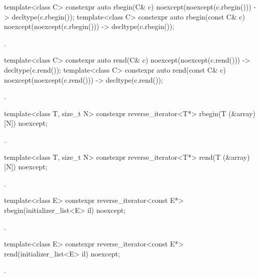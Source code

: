 %
\begin{itemdecl}
template<class C> constexpr auto rbegin(C& c) noexcept(noexcept(c.rbegin()))
  -> decltype(c.rbegin());
template<class C> constexpr auto rbegin(const C& c) noexcept(noexcept(c.rbegin()))
  -> decltype(c.rbegin());
\end{itemdecl}
\begin{itemdescr}
\pnum
\returns
{}.
\end{itemdescr}

%
\begin{itemdecl}
template<class C> constexpr auto rend(C& c) noexcept(noexcept(c.rend())) -> decltype(c.rend());
template<class C> constexpr auto rend(const C& c) noexcept(noexcept(c.rend()))
  -> decltype(c.rend());
\end{itemdecl}
\begin{itemdescr}
\pnum
\returns
{}.
\end{itemdescr}

%
\begin{itemdecl}
template<class T, size_t N> constexpr reverse_iterator<T*> rbegin(T (&array)[N]) noexcept;
\end{itemdecl}
\begin{itemdescr}
\pnum
\returns
{}.
\end{itemdescr}

%
\begin{itemdecl}
template<class T, size_t N> constexpr reverse_iterator<T*> rend(T (&array)[N]) noexcept;
\end{itemdecl}
\begin{itemdescr}
\pnum
\returns
{}.
\end{itemdescr}

%
\begin{itemdecl}
template<class E> constexpr reverse_iterator<const E*> rbegin(initializer_list<E> il) noexcept;
\end{itemdecl}
\begin{itemdescr}
\pnum
\returns
{}.
\end{itemdescr}

%
\begin{itemdecl}
template<class E> constexpr reverse_iterator<const E*> rend(initializer_list<E> il) noexcept;
\end{itemdecl}
\begin{itemdescr}
\pnum
\returns
{}.
\end{itemdescr}

